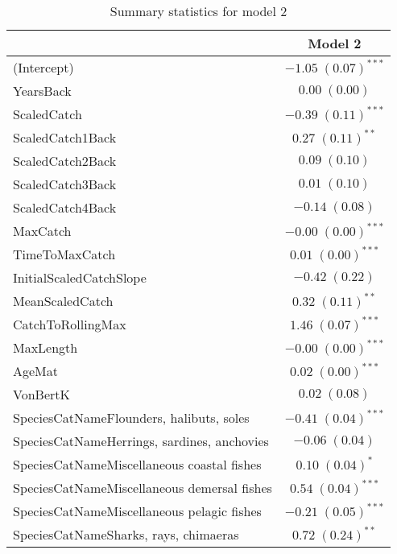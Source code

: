 \documentclass[]{article}
\begin{document}
\begin{table}[h]
\caption{Summary statistics for model 2}
\begin{center}
\begin{tabular}{l c }
\hline
                                            & Model 2 \\
\hline
(Intercept)                                 & $-1.05 \; (0.07)^{***}$ \\
YearsBack                                   & $0.00 \; (0.00)$        \\
ScaledCatch                                 & $-0.39 \; (0.11)^{***}$ \\
ScaledCatch1Back                            & $0.27 \; (0.11)^{**}$   \\
ScaledCatch2Back                            & $0.09 \; (0.10)$        \\
ScaledCatch3Back                            & $0.01 \; (0.10)$        \\
ScaledCatch4Back                            & $-0.14 \; (0.08)$       \\
MaxCatch                                    & $-0.00 \; (0.00)^{***}$ \\
TimeToMaxCatch                              & $0.01 \; (0.00)^{***}$  \\
InitialScaledCatchSlope                     & $-0.42 \; (0.22)$       \\
MeanScaledCatch                             & $0.32 \; (0.11)^{**}$   \\
CatchToRollingMax                           & $1.46 \; (0.07)^{***}$  \\
MaxLength                                   & $-0.00 \; (0.00)^{***}$ \\
AgeMat                                      & $0.02 \; (0.00)^{***}$  \\
VonBertK                                    & $0.02 \; (0.08)$        \\
SpeciesCatNameFlounders, halibuts, soles    & $-0.41 \; (0.04)^{***}$ \\
SpeciesCatNameHerrings, sardines, anchovies & $-0.06 \; (0.04)$       \\
SpeciesCatNameMiscellaneous coastal fishes  & $0.10 \; (0.04)^{*}$    \\
SpeciesCatNameMiscellaneous demersal fishes & $0.54 \; (0.04)^{***}$  \\
SpeciesCatNameMiscellaneous pelagic fishes  & $-0.21 \; (0.05)^{***}$ \\
SpeciesCatNameSharks, rays, chimaeras       & $0.72 \; (0.24)^{**}$   \\

\end{tabular}
\end{center}
\end{table}
\end{document}
